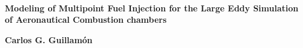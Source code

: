 \setlength{\unitlength}{1 cm} %
\thispagestyle{empty}




~ ~

\vspace{5.5cm}
  
\begin{center}

\Huge \textbf{Modeling of Multipoint Fuel Injection for the Large Eddy Simulation of Aeronautical Combustion chambers}



\vspace{10.5cm}

{\LARGE \textbf{Carlos G. Guillam\'on}}\\[1cm]
\end{center}


